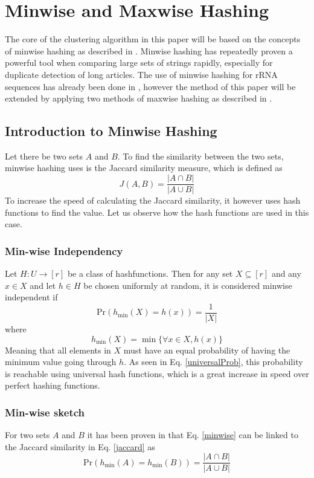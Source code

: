 \documentclass[../../main.tex]{subfiles}
\begin{document}
\section{Minwise and Maxwise Hashing}
The core of the clustering algorithm in this paper will be based on the concepts of minwise hashing as described in \cite{MinwiseIndependent}. Minwise hashing has repeatedly proven a powerful tool when comparing large sets of strings rapidly, especially for duplicate detection of long articles. The use of minwise hashing for rRNA sequences has already been done in \cite{MinhashMapreduce}, however the method of this paper will be extended by applying two methods of maxwise hashing as described in \cite{minmaxhash}.
\subsection{Introduction to Minwise Hashing}
Let there be two sets $A$ and $B$. To find the similarity between the two sets, minwise hashing uses is the Jaccard similarity measure, which is defined as
\begin{equation}\label{jaccard}
J(A,B)=\frac{|A\cap B|}{|A\cup B|}
\end{equation}
To increase the speed of calculating the Jaccard similarity, it however uses hash functions to find the value. Let us observe how the hash functions are used in this case.
\subsubsection{Min-wise Independency}
Let $H: U \rightarrow [r]$ be a class of hashfunctions. Then for any set $X\subseteq [r]$ and any $x \in X$ and let $h\in H$ be chosen uniformly at random, it is considered minwise independent if
\begin{equation}\label{minwise}
\mathrm{Pr}(h_{\min}(X)=h(x))=\frac{1}{|X|}
\end{equation}
where
$$
h_{\min}(X) = \min\{\forall x \in X, h(x)\} 
$$
Meaning that all elements in $X$ must have an equal probability of having the minimum value going through $h$. As seen in Eq. \ref{universalProb}, this probability is reachable using universal hash functions, which is a great increase in speed over perfect hashing functions.

\subsubsection{Min-wise sketch}
For two sets $A$ and $B$ it has been proven in \cite{protominwise} that Eq. \ref{minwise} can be linked to the Jaccard similarity in Eq. \ref{jaccard} as
\begin{equation}\label{minwisejaccard}
\mathrm{Pr}(h_{\min}(A)=h_{\min}(B))=\frac{|A\cap B|}{|A\cup B|}
\end{equation}
\end{document}
